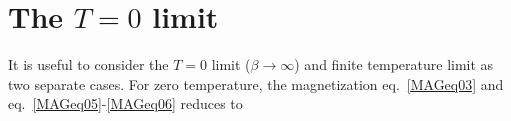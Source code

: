 \documentclass[
aps,
pra,
twocolumn,
showpacs,
preprintnumbers,
amsmath,
amssymb,
footinbib
]{revtex4-2}
\begin{document}
\section{The $T=0$ limit}\label{sec:ZEROsec}
It is useful to consider the $T=0$ limit ($\beta\rightarrow\infty$) and finite temperature limit as two separate cases. For zero temperature, the magnetization eq.~\eqref{MAGeq03} and eq.~\eqref{MAGeq05}-\eqref{MAGeq06} reduces to
\end{document}
